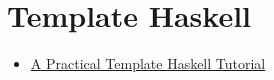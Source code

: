 \chapter{Template Haskell}

\begin{itemize}
    \item \href{https://wiki.haskell.org/A_practical_Template_Haskell_Tutorial}{A Practical Template Haskell Tutorial}
\end{itemize}
